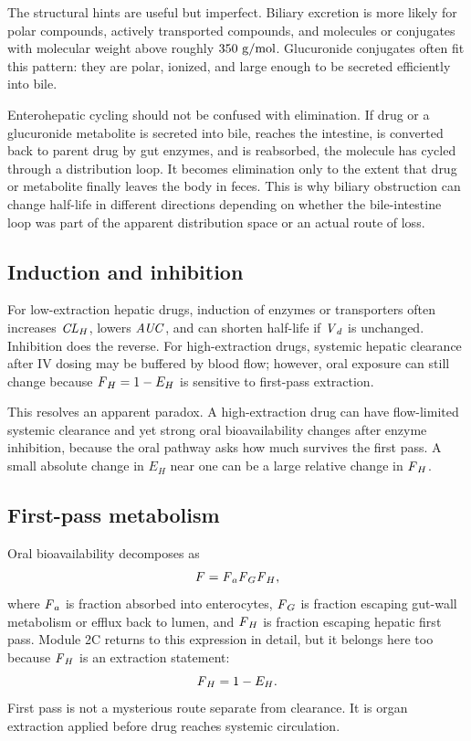 \documentclass[a4paper]{article}
\newcommand{\CLH}{\ensuremath{\pksym{CL}_{H}}}
\newcommand{\Vd}{\ensuremath{\pksym{V}_d}}
\newcommand{\AUC}{\ensuremath{\pksym{AUC}}}
\newcommand{\Fa}{\ensuremath{\pksym{F}_a}}
\newcommand{\Fg}{\ensuremath{\pksym{F}_G}}
\newcommand{\Fh}{\ensuremath{\pksym{F}_H}}
\newcommand{\Fbio}{\ensuremath{F}}
\newcommand{\EH}{\ensuremath{E_H}}
\begin{document}
The structural hints are useful but imperfect. Biliary excretion is more likely for polar compounds, actively transported compounds, and molecules or conjugates with molecular weight above roughly \(350\ \mathrm{g/mol}\). Glucuronide conjugates often fit this pattern: they are polar, ionized, and large enough to be secreted efficiently into bile.

Enterohepatic cycling should not be confused with elimination. If drug or a glucuronide metabolite is secreted into bile, reaches the intestine, is converted back to parent drug by gut enzymes, and is reabsorbed, the molecule has cycled through a distribution loop. It becomes elimination only to the extent that drug or metabolite finally leaves the body in feces. This is why biliary obstruction can change half-life in different directions depending on whether the bile-intestine loop was part of the apparent distribution space or an actual route of loss.

\subsection{Induction and inhibition}

For low-extraction hepatic drugs, induction of enzymes or transporters often increases \(\CLH\), lowers \(\AUC\), and can shorten half-life if \Vd{} is unchanged. Inhibition does the reverse. For high-extraction drugs, systemic hepatic clearance after IV dosing may be buffered by blood flow; however, oral exposure can still change because \(\Fh=1-\EH\) is sensitive to first-pass extraction.

This resolves an apparent paradox. A high-extraction drug can have flow-limited systemic clearance and yet strong oral bioavailability changes after enzyme inhibition, because the oral pathway asks how much survives the first pass. A small absolute change in \(\EH\) near one can be a large relative change in \(\Fh\).

\subsection{First-pass metabolism}

Oral bioavailability decomposes as
\[
  \Fbio = \Fa\Fg\Fh,
\]
where \(\Fa\) is fraction absorbed into enterocytes, \(\Fg\) is fraction escaping gut-wall metabolism or efflux back to lumen, and \(\Fh\) is fraction escaping hepatic first pass. Module 2C returns to this expression in detail, but it belongs here too because \(\Fh\) is an extraction statement:
\[
  \Fh = 1-\EH.
\]
First pass is not a mysterious route separate from clearance. It is organ extraction applied before drug reaches systemic circulation.
\end{document}
